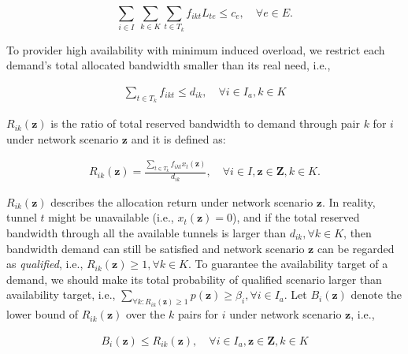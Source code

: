 \documentclass[sigconf]{acmart}
\begin{document}
\begin{equation}
 \sum_{i \in I}\ \sum_{k\in K}\sum_{t\in T_{k}}f_{ikt}L_{te} \le c_e, \quad \forall e \in E.
\label{constraint-e2}
\end{equation}

To provider high availability with minimum induced overload, we restrict each demand's total allocated bandwidth smaller than its real need, i.e., 


\begin{eqnarray} \label{Smaller}
 \sum_{t\in T_{k}} f_{ikt} \le d_{ik}, \quad  \forall i \in I_a, k \in K
\end{eqnarray}


$R_{ik}(\bm{z})$ is the ratio of total reserved bandwidth to demand through pair $k$ for $i$ under network scenario $\bm{z}$ and it is defined as:

 \begin{eqnarray} \label{R2}
R_{ik}(\bm{z})=\frac{\sum_{t\in T_{k}}f_{ikt}x_t(\bm{z}) }{d_{ik}}, \quad \forall  i \in I, \bm{z}\in \bm{Z}, k \in K.
\end{eqnarray}

$R_{ik}(\bm{z})$ describes the allocation return under network scenario $\bm{z}$.
In reality, tunnel $t$ might be unavailable (i.e., $x_t(\bm{z}) =0$), and if the total reserved bandwidth through all the available tunnels is larger than $d_{ik}, \forall k \in K$,  then bandwidth demand can still be satisfied and network scenario $\bm{z}$ can be regarded as \textit{qualified}, i.e., 
$R_{ik}(\bm{z}) \ge 1, \forall k \in K$.
To guarantee the availability target of a demand, we should make its total probability of qualified scenario larger than availability target, i.e., 
$\sum_{\forall k: R_{ik}(\bm{z}) \ge 1} p(\bm{z}) \ge \beta_i, \forall i \in I_a$.
% 
Let $B_i(\bm{z})$ denote the lower bound of $R_{ik}(\bm{z})$ over the $k$ pairs for  $i$ under network scenario $\bm{z}$,  i.e.,

 \begin{eqnarray} \label{B2}
B_i(\bm{z}) \le R_{ik}(\bm{z}), \quad  \forall  i \in I_a, \bm{z}\in \bm{Z}, k \in K
\end{eqnarray}
\end{document}
